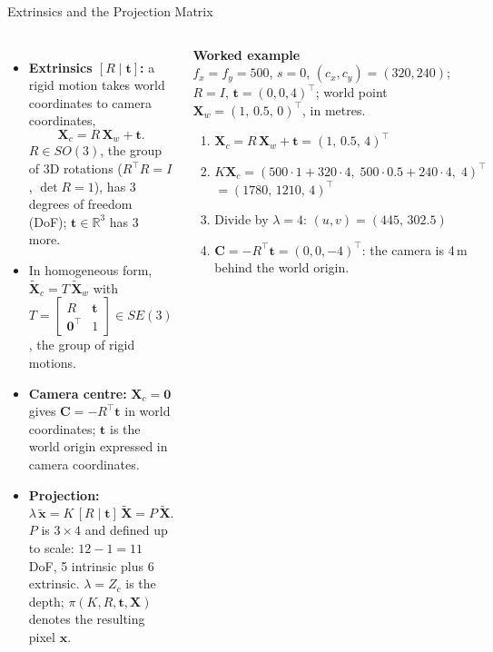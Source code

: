 \begin{frame}{Extrinsics and the Projection Matrix}
  \begin{columns}[T,onlytextwidth]
      \begin{itemize}\footnotesize\itemsep0.3em
        \item \textbf{Extrinsics $[R\mid\mathbf{t}]$:} a rigid motion takes world coordinates to camera coordinates,
        \[ \mathbf{X}_c = R\,\mathbf{X}_w+\mathbf{t}. \]
        $R\in SO(3)$, the group of 3D rotations ($R^\top R=I$, $\det R=1$), has 3 degrees of freedom (DoF); $\mathbf{t}\in\mathbb{R}^3$ has 3 more.
        \item In homogeneous form, $\tilde{\mathbf{X}}_c=T\,\tilde{\mathbf{X}}_w$ with $T=\begin{bmatrix}R&\mathbf{t}\\ \mathbf{0}^\top&1\end{bmatrix}\in SE(3)$, the group of rigid motions.
        \item \textbf{Camera centre:} $\mathbf{X}_c=\mathbf{0}$ gives $\mathbf{C}=-R^\top\mathbf{t}$ in world coordinates; $\mathbf{t}$ is the world origin expressed in camera coordinates.
        \item \textbf{Projection:}
        \[ \lambda\,\tilde{\mathbf{x}} = K\,[R\mid\mathbf{t}]\,\tilde{\mathbf{X}} = P\,\tilde{\mathbf{X}}. \]
        $P$ is $3\times4$ and defined up to scale: $12-1=11$ DoF, 5 intrinsic plus 6 extrinsic. $\lambda=Z_c$ is the depth; $\pi(K,R,\mathbf{t},\mathbf{X})$ denotes the resulting pixel $\mathbf{x}$.
      \end{itemize}
      \vspace{0.6em}
      \begin{tcolorbox}[colframe=KAred, colback=gray!6, boxrule=0.5pt, left=4pt, right=4pt, top=3pt, bottom=3pt]
        \footnotesize
        \textbf{Worked example}\\[0.3em]
        $f_x=f_y=500$, $s=0$, $(c_x,c_y)=(320,240)$; $R=I$, $\mathbf{t}=(0,0,4)^\top$; world point $\mathbf{X}_w=(1,\,0.5,\,0)^\top$, in metres.
        \begin{enumerate}\itemsep0.3em
          \item $\mathbf{X}_c=R\,\mathbf{X}_w+\mathbf{t}=(1,\,0.5,\,4)^\top$
          \item $K\mathbf{X}_c=(500\cdot1+320\cdot4,\;500\cdot0.5+240\cdot4,\;4)^\top$\\ $=(1780,\,1210,\,4)^\top$
          \item Divide by $\lambda=4$: $(u,v)=(445,\,302.5)$
          \item $\mathbf{C}=-R^\top\mathbf{t}=(0,0,-4)^\top$: the camera is 4\,m behind the world origin.
        \end{enumerate}
      \end{tcolorbox}
  \end{columns}
\end{frame}

